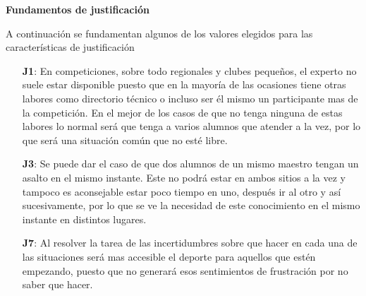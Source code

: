 \textbf{Fundamentos de justificación}

A continuación se fundamentan algunos de los valores elegidos para las características de justificación

\begin{enumerate}
  \item[\textbf{J1}:] En competiciones, sobre todo regionales y clubes pequeños, el experto
     no suele estar disponible puesto que en la mayoría de las ocasiones tiene otras labores
     como directorio técnico o incluso ser él mismo un participante mas de la competición.
     En el mejor de los casos de que no tenga ninguna de estas labores lo normal será que
     tenga a varios alumnos que atender a la vez, por lo que será una situación común que no esté libre.
  \item[\textbf{J3}:] Se puede dar el caso de que dos alumnos de un mismo maestro tengan un
     asalto en el mismo instante. Este no podrá estar en ambos sitios a la vez y tampoco es
     aconsejable estar poco tiempo en uno, después ir al otro y así sucesivamente, por lo que
     se ve la necesidad de este conocimiento en el mismo instante en distintos lugares.
  \item[\textbf{J7}:] Al resolver la tarea de las incertidumbres sobre que hacer
     en cada una de las situaciones será mas accesible el deporte para aquellos que estén
     empezando, puesto que no generará esos sentimientos de frustración por no saber que hacer.
\end{enumerate}

